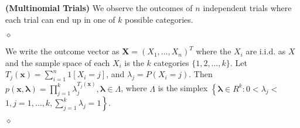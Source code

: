 \documentclass{article}
\newcommand{\bfs}[1]{\textbf{({#1}) }}
\begin{document}
\begin{exma}\bfs{Multinomial Trials}\label{ex:mul_trial_0} We observe the outcomes of $n$ independent trials where each trial can end up in one of $k$ possible categories.

$\diamond$ 

   We write the outcome vector as $\mathbf{X}=\left(X_{1}, \ldots, X_{n}\right)^{T}$ where the $X_{i}$ are i.i.d. as $X$ and the sample space of each $X_{i}$ is the $k$ categories $\{1,2, \ldots, k\} .$ Let $T_{j}(\mathbf{x})=\sum_{i=1}^{n} 1\left[X_{i}=j\right]$, and $\lambda_{j}=P\left(X_{i}=j\right)$. Then $p(\mathbf{x}, \boldsymbol{\lambda})=\prod_{j=1}^{k} \lambda_{j}^{T_{j}(\mathbf{x})}, \boldsymbol{\lambda} \in \Lambda$, where $\Lambda$ is the simplex $\left\{\boldsymbol{\lambda} \in R^{k}: 0<\lambda_{j}<\right.$ $\left.1, j=1, \ldots, k, \sum_{j=1}^{k} \lambda_{j}=1\right\}$. 
 
 $\diamond$  
 

\end{exma}
\end{document}
